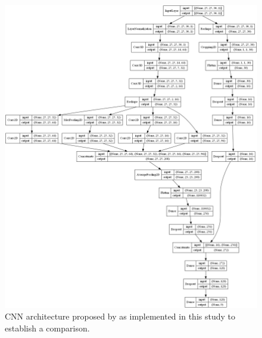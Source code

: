 \begin{figure}[ht]
    \centering
    \includegraphics[width=\linewidth]{figs/vineyard_classification/networks/jigsaw_hsi_25x24_0.png}
	\caption{CNN architecture proposed by \cite{moraga_jigsawhsi_2022} as implemented in this study to establish a comparison. }
	\label{fig:jigsaw_cnn}
\end{figure}


